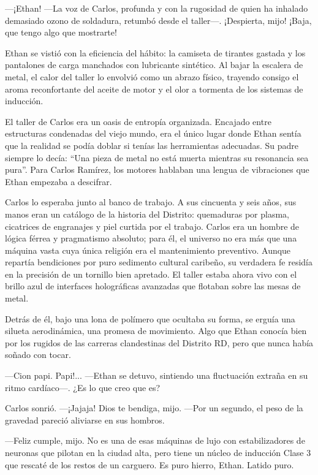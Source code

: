 \documentclass[12pt,a4paper]{book}
\begin{document}
---¡Ethan! ---La voz de Carlos, profunda y con la rugosidad de quien ha inhalado demasiado ozono de soldadura, retumbó desde el taller---. ¡Despierta, mijo! ¡Baja, que tengo algo que mostrarte!

Ethan se vistió con la eficiencia del hábito: la camiseta de tirantes gastada y los pantalones de carga manchados con lubricante sintético. Al bajar la escalera de metal, el calor del taller lo envolvió como un abrazo físico, trayendo consigo el aroma reconfortante del aceite de motor y el olor a tormenta de los sistemas de inducción.

El taller de Carlos era un oasis de entropía organizada. Encajado entre estructuras condenadas del viejo mundo, era el único lugar donde Ethan sentía que la realidad se podía doblar si tenías las herramientas adecuadas. Su padre siempre lo decía: ``Una pieza de metal no está muerta mientras su resonancia sea pura''. Para Carlos Ramírez, los motores hablaban una lengua de vibraciones que Ethan empezaba a descifrar.

Carlos lo esperaba junto al banco de trabajo. A sus cincuenta y seis años, sus manos eran un catálogo de la historia del Distrito: quemaduras por plasma, cicatrices de engranajes y piel curtida por el trabajo. Carlos era un hombre de lógica férrea y pragmatismo absoluto; para él, el universo no era más que una máquina vasta cuya única religión era el mantenimiento preventivo. Aunque repartía bendiciones por puro sedimento cultural caribeño, su verdadera fe residía en la precisión de un tornillo bien apretado. El taller estaba ahora vivo con el brillo azul de interfaces holográficas avanzadas que flotaban sobre las mesas de metal.

Detrás de él, bajo una lona de polímero que ocultaba su forma, se erguía una silueta aerodinámica, una promesa de movimiento. Algo que Ethan conocía bien por los rugidos de las carreras clandestinas del Distrito RD, pero que nunca había soñado con tocar.

---Cion papi. Papi!... ---Ethan se detuvo, sintiendo una fluctuación extraña en su ritmo cardíaco---. ¿Es lo que creo que es?

Carlos sonrió. ---¡Jajaja! Dios te bendiga, mijo. ---Por un segundo, el peso de la gravedad pareció aliviarse en sus hombros.

---Feliz cumple, mijo. No es una de esas máquinas de lujo con estabilizadores de neuronas que pilotan en la ciudad alta, pero tiene un núcleo de inducción Clase 3 que rescaté de los restos de un carguero. Es puro hierro, Ethan. Latido puro.
\end{document}
